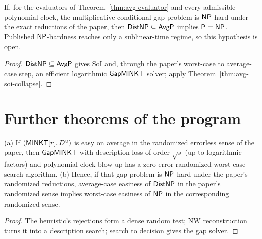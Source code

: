 \begin{theorem}
  \label{thm:avg-hardness-heuristica}
  \notready
  If, for the evaluators of Theorem~\ref{thm:avg-evaluator} and every admissible
  polynomial clock, the multiplicative conditional gap problem is
  $\mathsf{NP}$-hard under the exact reductions of the paper, then
  $\mathsf{DistNP} \subseteq \mathsf{AvgP}$ implies $\mathsf{P} = \mathsf{NP}$. Published
  $\mathsf{NP}$-hardness reaches only a sublinear-time regime, so this hypothesis is
  open.
\end{theorem}
\begin{proof}
  $\mathsf{DistNP} \subseteq \mathsf{AvgP}$ gives SoI and, through the paper's
  worst-case to average-case step, an efficient logarithmic $\mathsf{GapMINKT}$
  solver; apply Theorem~\ref{thm:avg-soi-collapse}.
\end{proof}

\section{Further theorems of the program}

\begin{theorem}
  \label{thm:avg-minkt-2018}
  \notready
  (a) If $(\mathsf{MINKT}[r], D^u)$ is easy on average in the randomized errorless
  sense of the paper, then $\mathsf{GapMINKT}$ with description loss of order
  $\sqrt{s}$ (up to logarithmic factors) and polynomial clock blow-up has a
  zero-error randomized worst-case search algorithm. (b) Hence, if that gap
  problem is $\mathsf{NP}$-hard under the paper's randomized reductions,
  average-case easiness of $\mathsf{DistNP}$ in the paper's randomized sense implies
  worst-case easiness of $\mathsf{NP}$ in the corresponding randomized sense.
\end{theorem}
\begin{proof}
  The heuristic's rejections form a dense random test; NW reconstruction turns
  it into a description search; search to decision gives the gap solver.
\end{proof}

